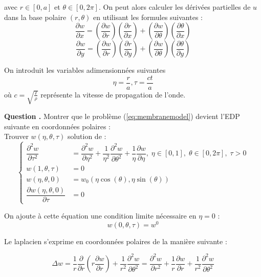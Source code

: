 \documentclass[a4,12pt]{article}
\newcounter{Nbquestion}
\newcommand*\question{%
\stepcounter{Nbquestion}%
\textbf{Question \theNbquestion. }}
\begin{document}
avec $r \in[0,a]$ et $\theta  \in [0,2\pi]$. On peut alors calculer les dérivées partielles de $u$ dans la base polaire $(r,\theta)$ en utilisant les formules suivantes :
\[
\dfrac{\partial w}{\partial x}=\left(\dfrac{\partial w}{\partial r}\right)\left(\dfrac{\partial r}{\partial x}\right)+\left(\dfrac{\partial w}{\partial \theta}\right)\left(\dfrac{\partial \theta}{\partial x}\right)
\]
\[
\dfrac{\partial w}{\partial y}=\left(\dfrac{\partial w}{\partial r}\right)\left(\dfrac{\partial r}{\partial y}\right)+\left(\dfrac{\partial w}{\partial \theta}\right)\left(\dfrac{\partial \theta}{\partial y}\right)
\]

On introduit les variables adimensionnées suivantes 
\[
\eta=\dfrac{r}{a},\tau=\dfrac{ct}{a}
\]
où $c=\sqrt{\frac{T}{\rho}}$ représente la vitesse de propagation  de l'onde.\\ 


\begin{mdframed}[style=exampledefault]
\question Montrer que le problème (\ref{eq:membranemodel}) devient l'EDP suivante en coordonnées polaires :\\

Trouver $w(\eta,\theta,\tau)$ solution de :
\begin{equation}
	\left\{
	\begin{array}{rl}
		 \dfrac{\partial^2 w}{\partial \tau^2} & =   \dfrac{\partial^2 w}{\partial \eta^2}+\dfrac{1}
		 {\eta^2}\dfrac{\partial^2 w}{\partial \theta^2}+\dfrac{1}{\eta}\dfrac{\partial w}{\partial \eta},\;\eta\in[0,1],\;		\theta\in[0,2\pi],\;\tau>0\\
		w(1,\theta,\tau)& = 0  \\
		w(\eta,\theta,0)& = w_0(\eta \cos(\theta),\eta \sin (\theta)) \\
		\dfrac{\partial w(\eta,\theta,0)}{\partial \tau} & = 0
	\end{array}
	\right.
	\label{eq:polarmodel}
\end{equation}

On ajoute à cette équation une condition limite nécessaire  en $\eta=0$ :
\[
w(0,\theta,\tau)=w^0
\]
\end{mdframed}

Le laplacien s'exprime en coordonnées polaires de la manière suivante :

$$
\Delta w = \frac{1}{r} \frac{\partial}{\partial r} (r \frac{\partial w}{\partial r}) +
\frac{1}{r^2} \frac{\partial^2 w}{\partial \theta^2} =
\frac{\partial^2 w}{\partial r^2} + \frac{1}{r} \frac{\partial w}{\partial r} + \frac{1}{r^2} \frac{\partial^2 w}{\partial \theta^2}
$$
\end{document}
